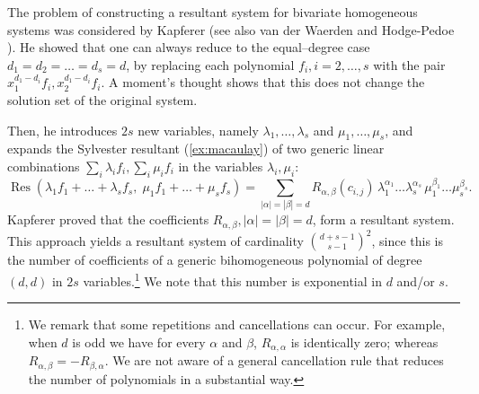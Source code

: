 \documentclass[11pt,a4paper]{article}
\numberwithin{equation}{section}
\DeclareMathOperator{\Res}{Res}
\begin{document}
The problem of constructing a resultant system for bivariate homogeneous systems was considered by Kapferer \cite{Kapferer-29} (see also van der Waerden \cite{vdWaerden-40} and Hodge-Pedoe \cite{Hodge-Pedoe-94}).
He showed that one can always reduce to the equal--degree case $d_1=d_2=\dots=d_s=d$, by replacing each polynomial $f_i, i=2,\dots,s$ with the pair $x_1^{d_1-d_i}f_i, x_2^{d_1-d_i}f_i$.
A moment's thought shows that this does not change the solution set of the original system.

Then, he introduces $2s$ new variables, namely $\lambda_1,\dots,\lambda_s$ and $\mu_1,\dots,\mu_s$, and  expands the Sylvester resultant (\cref{ex:macaulay}) of two generic linear combinations $\sum_i\lambda_i f_i, \sum_i \mu_i f_i$ in the variables $\lambda_i,\mu_i$: \[
\Res\left( \lambda_1 f_1 + \dots + \lambda_s f_s,\; \mu_1 f_1 + \dots + \mu_s f_s \right) = \sum_{|\alpha|=|\beta|=d} R_{\alpha,\beta}(c_{i,j}) \, \lambda_1^{\alpha_1}\dots\lambda_s^{\alpha_s} \, \mu_1^{\beta_1}\dots \mu_s^{\beta_s}.
\] Kapferer proved that the coefficients $R_{\alpha,\beta}, |\alpha|=|\beta|=d$, form a resultant system.
This approach yields a resultant system of cardinality $\binom{d+s-1}{s-1}^2$, since this is the number of coefficients of a generic bihomogeneous polynomial of degree $(d,d)$ in $2s$ variables.\footnote{We remark that some repetitions and cancellations can occur. For example, when $d$ is odd we have for every $\alpha$ and $\beta$, $R_{\alpha,\alpha}$ is identically zero; whereas $R_{\alpha,\beta}=- R_{\beta,\alpha}$. 
We are not aware of a general cancellation rule that reduces the number of polynomials in a substantial way.}
We note that this number is exponential in $d$ and/or $s$.
\end{document}
